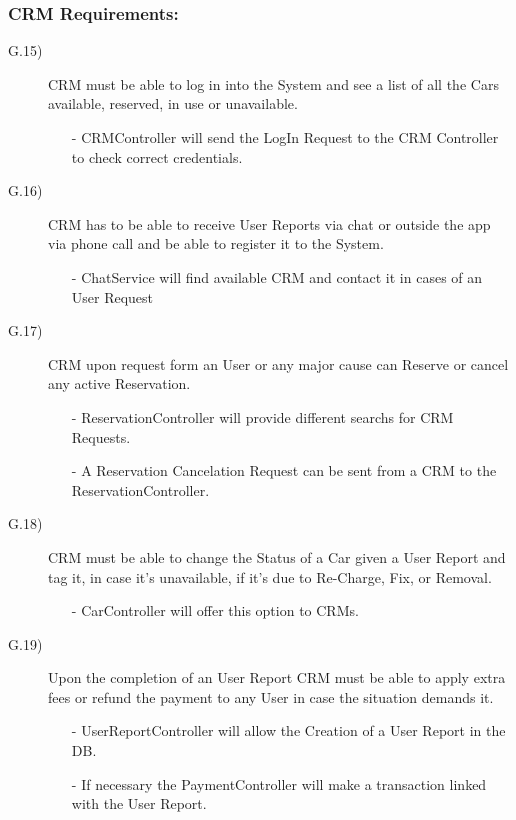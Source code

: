 \documentclass[a4paper]{article}
\begin{document}
\newpage
\subsubsection{\textbf{CRM Requirements:}}
\begin{description}
\item [G.15)]CRM must be able to log in into the System and see a list of all the Cars available, reserved, in use or unavailable.
\begin{itemize}
	\item[-]CRMController will send the LogIn Request to the CRM Controller to check correct credentials.
\end{itemize}
\item [G.16)]CRM has to be able to receive User Reports via chat or outside the app via phone call and be able to register it to the System.
\begin{itemize}
	\item[-]ChatService will find available CRM and contact it in cases of an User Request
\end{itemize}
\item [G.17)]CRM upon request form an User or any major cause can Reserve or cancel any active Reservation.
\begin{itemize}
	\item[-]ReservationController will provide different searchs for CRM Requests.
	\item[-]A Reservation Cancelation Request can be sent from a CRM to the ReservationController.
\end{itemize}
\item [G.18)]CRM must be able to change the Status of a Car given a User Report and tag it, in case it's unavailable, if it's due to Re-Charge, Fix, or Removal.
\begin{itemize}
	\item[-]CarController will offer this option to CRMs.
\end{itemize}
\item [G.19)]Upon the completion of an User Report CRM must be able to apply extra fees or refund the payment to any User in case the situation demands it.
\begin{itemize}
	\item[-]UserReportController will allow the Creation of a User Report in the DB.
	\item[-]If necessary the PaymentController will make a transaction linked with the User Report.
\end{itemize}
\end {description}
\end{document}
